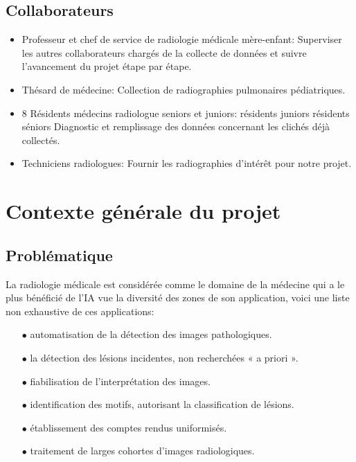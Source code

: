         \subsection{Collaborateurs}\label{Collaborateurs}
            \begin{itemize}[label=$\bullet$]
                \item Professeur et chef de service de radiologie médicale mère-enfant:\newline
                Superviser les autres collaborateurs chargés de la collecte de données et suivre l'avancement du projet étape par étape.
                \item Thésard de médecine:\newline
                Collection de radiographies pulmonaires pédiatriques.
                \item 8 Résidents médecins radiologue seniors et juniors: résidents juniors résidents séniors \newline
                Diagnostic et remplissage des données concernant les clichés déjà collectés.
                \item Techniciens radiologues:\newline
                Fournir les radiographies d'intérêt pour notre projet.
            \end{itemize}


    \section{Contexte générale du projet}

        \subsection{Problématique}
            La radiologie médicale est considérée comme le domaine de la médecine qui a le plus bénéficié de l'IA  vue la diversité des zones de son application, voici une liste non exhaustive de ces applications:
            \vspace{3mm}
            \begin{itemize}
                \item[$\bullet$] automatisation de la détection des images pathologiques.
                \item[$\bullet$] la détection des lésions incidentes, non recherchées « a priori ».
                \item[$\bullet$] fiabilisation de l’interprétation des images.
                \item[$\bullet$] identification des motifs, autorisant la classification de lésions.
                \item[$\bullet$] établissement des comptes rendus uniformisés.
                \item[$\bullet$] traitement de larges cohortes d’images radiologiques. 
            \end{itemize}
            \vspace{5mm}

